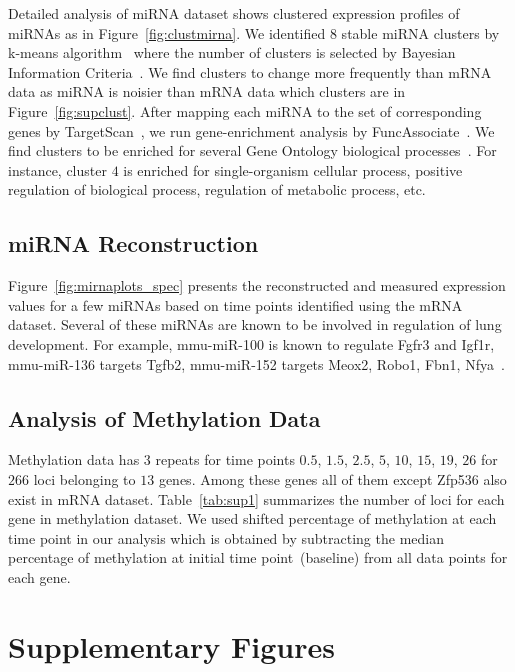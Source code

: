 \documentclass[10pt]{article}
\begin{document}
Detailed analysis of miRNA dataset shows clustered expression profiles
of miRNAs as in Figure~\ref{fig:clustmirna}. We identified $8$ stable miRNA
clusters by k-means algorithm~\cite{kmeans} where the number of clusters is selected by
Bayesian Information Criteria~\cite{bic}. We find clusters to change more frequently
than mRNA data as miRNA is noisier than mRNA data which clusters are in Figure~\ref{fig:supclust}. After mapping each miRNA to
the set of corresponding genes by TargetScan~\cite{agarwal2015}, we run
gene-enrichment analysis by FuncAssociate~\cite{berriz2003}. We find clusters to be enriched
for several Gene Ontology biological processes~\cite{go}. For
instance, cluster $4$ is enriched for single-organism cellular
process, positive regulation of biological process, regulation of
metabolic process, etc.

\subsection{miRNA Reconstruction}

Figure~\ref{fig:mirnaplots_spec} presents the reconstructed and measured
expression values for a few miRNAs based on time points identified using the
mRNA dataset. Several of these miRNAs are known to be involved in regulation of lung development. For example,
mmu-miR-100 is known to regulate Fgfr3 and Igf1r, mmu-miR-136 targets Tgfb2, mmu-miR-152 targets Meox2,
Robo1, Fbn1, Nfya~\cite{popova2014}.

\subsection{Analysis of Methylation Data}

Methylation data has $3$ repeats for time points $0.5$, $1.5$,
$2.5$, $5$, $10$, $15$, $19$, $26$ for $266$ loci belonging to $13$
genes. Among these genes all of them except Zfp536 also exist in
mRNA dataset. Table~\ref{tab:sup1} summarizes the
number of loci for each gene in methylation dataset. We used shifted
percentage of methylation at each time point in our analysis which is
obtained by subtracting the median percentage of methylation at
initial time point~(baseline) from all data points for each gene.

\newpage

\section*{Supplementary Figures}
\end{document}
